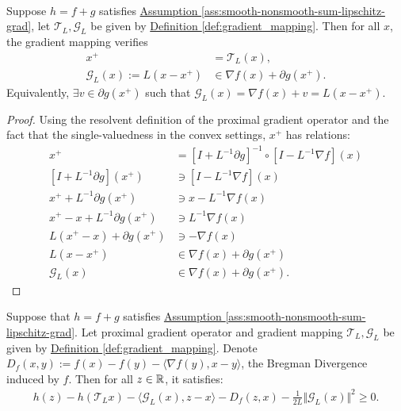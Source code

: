 \documentclass[12pt]{article}
\begin{document}
    \begin{lemma}
    \label{lemma:grad-map-approx-subgrad}\; \\
        Suppose $h = f + g$ satisfies 
        \hyperref[ass:smooth-nonsmooth-sum-lipschitz-grad]
        {Assumption \ref{ass:smooth-nonsmooth-sum-lipschitz-grad}}, 
        let $\mathcal T_L, \mathcal G_L$ be given by 
        \hyperref[def:gradient_mapping]{Definition \ref*{def:gradient_mapping}}.
        Then for all $x$, the gradient mapping verifies
        \begin{align*}
            x^+ &= \mathcal T_L(x), 
            \\
            \mathcal G_L(x) := L(x - x^+) &\in  \nabla f(x) + \partial g(x^+). 
        \end{align*}
        Equivalently, $\exists v \in \partial g(x^+)$ such that $\mathcal G_L(x) = \nabla f(x) + v = L(x - x^+)$. 
    \end{lemma}
    \begin{proof}
        Using the resolvent definition of the proximal gradient operator and the fact that the single-valuedness in the convex settings, $x^+$ has relations: 
        \begin{align*}
            x^+ &= [I + L^{-1}\partial g]^{-1}\circ [I - L^{-1}\nabla f](x)
            \\
            [I + L^{-1}\partial g](x^+) &\ni [I - L^{-1}\nabla f](x)
            \\
            x^+ + L^{-1}\partial g(x^+) &\ni x - L^{-1}\nabla f(x)
            \\
            x^+ - x + L^{-1}\partial g(x^+) &\ni L^{-1}\nabla f(x)
            \\
            L(x^+ - x) + \partial g(x^+) &\ni - \nabla f(x)
            \\
            L(x - x^+) &\in \nabla f(x) + \partial g(x^+)
            \\
            \mathcal G_L(x) &\in \nabla f(x) + \partial g(x^+). 
        \end{align*}
    \end{proof}
    \begin{theorem}\label{thm:prox-grad-inequality}
        Suppose that $h = f + g$ satisfies 
        \hyperref[ass:smooth-nonsmooth-sum-lipschitz-grad]
        {Assumption \ref*{ass:smooth-nonsmooth-sum-lipschitz-grad}}. 
        Let proximal gradient operator and gradient mapping $\mathcal T_L, \mathcal G_L$ be given by
        \hyperref[def:gradient_mapping]{Definition \ref*{def:gradient_mapping}}. 
        Denote $D_f(x, y) := f(x) - f(y) - \langle \nabla f(y), x - y\rangle$, the Bregman Divergence induced by $f$. 
        Then for all $z \in \mathbb R$, it satisfies: 
        \begin{align*}
            h(z) - h(\mathcal T_L x) - \langle \mathcal G_L (x), z - x\rangle - 
            D_f(z, x) - \frac{1}{2L}\Vert \mathcal G_L(x)\Vert^2 \ge 0. 
        \end{align*}
    \end{theorem}
\end{document}

